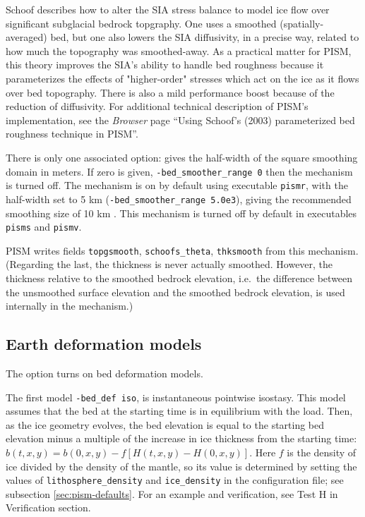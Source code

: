 Schoof \cite{Schoofbasaltopg2003} describes how to alter the SIA stress balance to model ice flow over significant subglacial bedrock topgraphy.  One uses a smoothed (spatially-averaged) bed, but one also lowers the SIA diffusivity, in a precise way, related to how much the topography was smoothed-away.  As a practical matter for PISM, this theory improves the SIA's ability to handle bed roughness because it parameterizes the effects of "higher-order" stresses which act on the ice as it flows over bed topography.  There is also a mild performance boost because of the reduction of diffusivity.  For additional technical description of PISM's implementation, see the \emph{Browser} page ``Using Schoof's (2003) parameterized bed roughness technique in PISM''.

There is only one associated option:  gives the half-width of the square smoothing domain in meters.  If zero is given, \texttt{-bed_smoother_range 0} then the mechanism is turned off.  The mechanism is on by default using executable \texttt{pismr}, with the half-width set to 5 km (\texttt{-bed_smoother_range 5.0e3}), giving the recommended smoothing size of 10 km \cite{Schoofbasaltopg2003}.  This mechanism is turned off by default in executables \texttt{pisms} and \texttt{pismv}.

PISM writes fields \texttt{topgsmooth}, \texttt{schoofs_theta}, \texttt{thksmooth} from this mechanism.  (Regarding the last, the thickness is never actually smoothed.  However, the thickness relative to the smoothed bedrock elevation, i.e.~the difference between the unsmoothed surface elevation and the smoothed bedrock elevation, is used internally in the mechanism.)


\subsection{Earth deformation models} \label{subsect:beddef}  

The option  turns on bed deformation models.

The first model \verb|-bed_def iso|, is instantaneous pointwise isostasy.  This model assumes that the bed at the starting time is in equilibrium with the load.  Then, as the ice geometry evolves, the bed elevation is equal to the starting bed elevation minus a multiple of the increase in ice thickness from the starting time: $b(t,x,y) = b(0,x,y) - f [H(t,x,y) - H(0,x,y)]$.  Here $f$ is the density of ice divided by the density of the mantle, so its value is determined by setting the values of \verb|lithosphere_density| and \verb|ice_density| in the configuration file; see subsection \ref{sec:pism-defaults}.  For an example and verification, see Test H in Verification section. 

